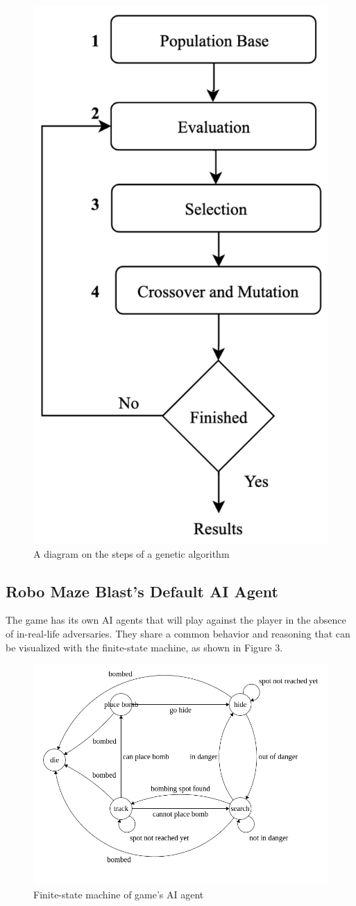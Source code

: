 \documentclass[sigconf]{acmart} %
\begin{document}
\begin{figure}
\centering
\includegraphics[width = 0.4\linewidth]{pictures/Steps-of-Genetic-Algorithms.png}
\caption{\label{fig:Steps-of-Genetic-Algorithm}A diagram on the steps of a genetic algorithm}
\end{figure}


\subsection{Robo Maze Blast's Default AI Agent}
The game has its own AI agents that will play against the player in the absence of in-real-life adversaries. They share a common behavior and reasoning that can be visualized with the finite-state machine, as shown in 
Figure 3.

\begin{figure}
\includegraphics[width = 1\linewidth]{pictures/bomberman_finite_state_machine 1.png}
\caption{\label{fig:bomberman_finite_state_machine 1}Finite-state machine of game's AI agent}
\end{figure}
\end{document}

